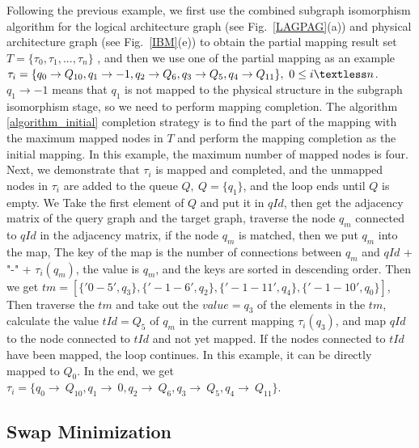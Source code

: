 \documentclass[runningheads]{llncs}
\begin{document}
	\begin{example}
		Following the previous example, 
we first use the combined subgraph isomorphism algorithm for the logical architecture graph
(see Fig.~\ref{LAGPAG}(a)) and physical architecture graph (see Fig.~\ref{IBM}(e)) 
to obtain the partial mapping result set $T=\{\tau_{0},\tau_{1},...,\tau_{n}\}$ , 
and then we use one of the partial mapping as an example
$\tau_{i}=\{q_{0}\rightarrow Q_{10},q_{1}\rightarrow -1,
	q_{2}\rightarrow Q_{6},q_{3}\rightarrow Q_{5},q_{4}\rightarrow Q_{11}\}, \ 0 \le i \textless n$. 
	$q_{1}\rightarrow -1$ means that $q_{1}$ is not mapped to the physical structure in the subgraph isomorphism stage,
	so we need to perform mapping completion. 
	The algorithm \ref{algorithm_initial} completion strategy is to find the part of the mapping with
	the maximum mapped nodes in $T$ and perform the mapping completion as the initial mapping.
	In this example, the maximum number of mapped nodes is four. 
	Next, we demonstrate that $\tau_{i}$ is mapped and completed, 
	and the unmapped nodes in $\tau_{i}$ are added to the queue $Q, \ Q=\{q_{1}\}$, 
	and the loop ends until $Q$ is empty. 
	We Take the first element of $Q$ and put it in $qId$, 
	then get the adjacency matrix of the query graph and the target graph, 
	traverse the node $q_{m}$ connected to $qId$ in the adjacency matrix, 
	if the node $q_{m}$ is matched, then we put $q_{m}$ into the map, 
	The key of the map is the number of connections between $q_{m}$ and $qId$ + "-" + $\tau_{i}(q_{m})$,
	 the value is $q_{m}$, and the keys are sorted in descending order. 
	 Then we get $tm=[\{'0-5',q_{3}\},\{'-1-6',q_{2}\},\{'-1-11',q_{4}\},\{'-1-10',q_{0}\}]$, 
	 Then traverse the $tm$ and take out the $value=q_{3}$ of the elements in the $tm$, 
	 calculate the value $tId=Q_{5}$ of $q_{m}$ in the current mapping $\tau_{i}(q_{3})$, 
	 and map $qId$ to the node connected to $tId$ and not yet mapped. 
	 If the nodes connected to $tId$ have been mapped, 
	 the loop continues. In this example, it can be directly mapped to $Q_{0}$. In the end, we get 
	 $ \tau_{i}=\{q_{0}\rightarrow \ Q_{10},q_{1}\rightarrow \ 0,
	q_{2}\rightarrow \ Q_{6},q_{3}\rightarrow \ Q_{5},q_{4}\rightarrow \ Q_{11}\}$.
	\end{example}
\subsection{Swap Minimization}
\end{document}
